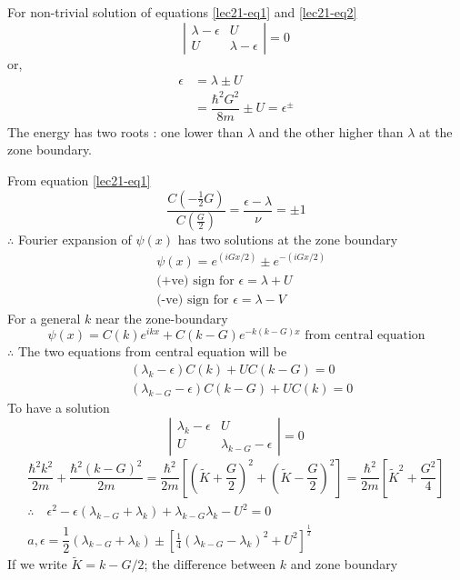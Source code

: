 For non-trivial solution of equations \eqref{lec21-eq1} and \eqref{lec21-eq2}
$$
\left|
\begin{array}{cc}
\lambda-\epsilon & U\\
U & \lambda-\epsilon
\end{array}
\right|=0
$$
or,
\begin{align*}
\epsilon &= \lambda\pm U\\
&= \dfrac{\hbar^{2}G^{2}}{8m}\pm U=\epsilon^{\pm}
\end{align*}
The energy has two roots : one lower than $\lambda$ and the other higher than $\lambda$ at the zone boundary.

From equation \eqref{lec21-eq1} 
$$
\dfrac{C\left(-\frac{1}{2}G\right)}{C\left(\frac{G}{2}\right)}=\dfrac{\epsilon-\lambda}{\nu}=\pm 1
$$
$\therefore$ Fourier expansion of $\psi(x)$ has two solutions at the zone boundary 
\begin{align*}
& \psi(x)=e^{(iGx/2)}\pm e^{-(iGx/2)}\\
&\text{(+ve) sign for } \epsilon=\lambda+U\\
&\text{(-ve) sign for } \epsilon=\lambda-V
\end{align*}
For a general $k$ near the zone-boundary
$$
\psi(x)=C(k)e^{ikx}+C(k-G)e^{-k(k-G)x}\text{ from central equation}
$$
$\therefore$ The two equations from central equation will be
\begin{align*}
& (\lambda_{k}-\epsilon)C(k)+UC(k-G)=0\\
& (\lambda_{k-G}-\epsilon)C(k-G)+UC(k)=0
\end{align*}
To have a solution
$$
\left|
\begin{array}{cc}
\lambda_{k}-\epsilon & U\\
U & \lambda_{k-G}-\epsilon
\end{array}
\right|=0
$$
\begin{gather*}
\dfrac{\hbar^{2}k^{2}}{2m}+\dfrac{\hbar^{2}(k-G)^{2}}{2m}=\dfrac{\hbar^{2}}{2m}\left[\left(\widetilde{K}+\dfrac{G}{2}\right)^{2}+\left(\widetilde{K}-\dfrac{G}{2}\right)^{2}\right]=\dfrac{\hbar^{2}}{2m}\left[\widetilde{K}^{2}+\dfrac{G^{2}}{4}\right]\\
\therefore\quad \epsilon^{2}-\epsilon (\lambda_{k-G}+\lambda_{k})+\lambda_{k-G}\lambda_{k}-U^{2}=0\\
a, \epsilon=\dfrac{1}{2}(\lambda_{k-G}+\lambda_{k})\pm \left[\frac{1}{4}(\lambda_{k-G}-\lambda_{k})^{2}+U^{2}\right]^{\frac{1}{2}}
\end{gather*}
If we write $\widetilde{K}=k-G/2$; the difference between $k$ and zone boundary
